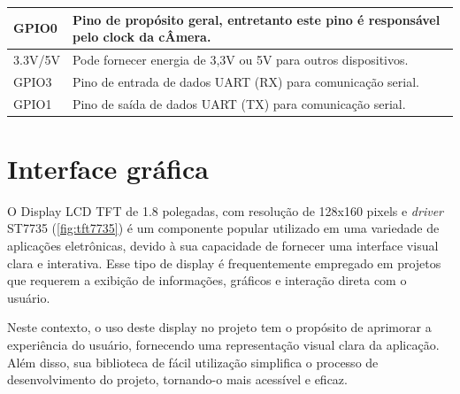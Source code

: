 \begin{tabframed}[htb]
\begin{tabular}{|l|l|}
        GPIO0          & Pino de propósito geral, entretanto este pino é responsável pelo clock da cÂmera.           \\ \hline
        3.3V/5V        & Pode fornecer energia de 3,3V ou 5V para outros dispositivos.                               \\ \hline
        GPIO3          & Pino de entrada de dados UART (RX) para comunicação serial.                                 \\ \hline
        GPIO1          & Pino de saída de dados UART (TX) para comunicação serial.                                   \\ \hline
    \end{tabular}
    \fonte{}%
\end{tabframed}

\section{Interface gráfica}\label{sec:interface}

O Display LCD TFT de 1.8 polegadas, com resolução de 128x160 pixels
e \textit{driver} ST7735 (\autoref{fig:tft7735}) é um componente popular 
utilizado em uma variedade de aplicações eletrônicas, devido à sua 
capacidade de fornecer uma interface visual clara e interativa. 
Esse tipo de display é frequentemente empregado em projetos que requerem 
a exibição de informações, gráficos e interação direta com o usuário.

Neste contexto, o uso deste display no projeto tem o propósito de aprimorar 
a experiência do usuário, fornecendo uma representação visual clara da 
aplicação. Além disso, sua biblioteca de fácil utilização simplifica o 
processo de desenvolvimento do projeto, tornando-o mais acessível e eficaz.

